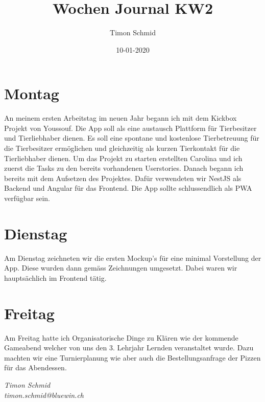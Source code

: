 \documentclass[12pt, titlepage]{article}
\title{Wochen Journal KW2}
\date{10-01-2020}
\author{Timon Schmid}
\begin{document}
  \maketitle

  \newpage


  \section{Montag}
  An meinem ersten Arbeitstag im neuen Jahr begann ich mit dem Kickbox Projekt von Youssouf.
  Die App soll als eine austausch Plattform für Tierbesitzer und Tierliebhaber dienen.
  Es soll eine spontane und kostenlose Tierbetreuung für die Tierbesitzer ermöglichen
  und gleichzeitig als kurzen Tierkontakt für die Tierliebhaber dienen.
  Um das Projekt zu starten erstellten Carolina und ich zuerst die Tasks zu den bereits
  vorhandenen Userstories.
  Danach begann ich bereits mit dem Aufsetzen des Projektes. Dafür verwendeten wir NestJS
  als Backend und Angular für das Frontend. Die App sollte schlussendlich als PWA verfügbar
  sein.

  \section{Dienstag}
  Am Dienstag zeichneten wir die ersten Mockup's für eine minimal Vorstellung der App. Diese
  wurden dann gemäss Zeichnungen umgesetzt. Dabei waren wir hauptsächlich im Frontend tätig.

  \section{Freitag}
  Am Freitag hatte ich Organisatorische Dinge zu Klären wie der kommende Gameabend welcher
  von uns den 3. Lehrjahr Lernden veranstaltet wurde. Dazu machten wir eine Turnierplanung
  wie aber auch die Bestellungsanfrage der Pizzen für das Abendessen.

  \vspace*{\fill}
  \hfill \break
  \textit{Timon Schmid \\ timon.schmid@bluewin.ch}
\end{document}
